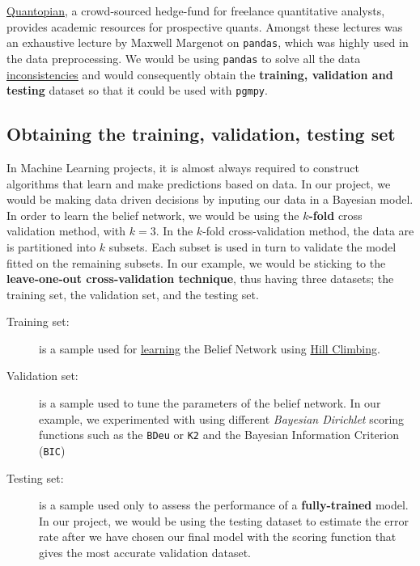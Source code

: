 \href{https://www.quantopian.com/}{Quantopian}, a crowd-sourced hedge-fund for freelance quantitative analysts, provides academic resources for prospective quants. Amongst these lectures was an exhaustive lecture by Maxwell Margenot \cite{maxwell} on \texttt{pandas}, which was highly used in the data preprocessing. We would be using \texttt{pandas} to solve all the data \hyperref[incons]{inconsistencies} and would consequently obtain the \textbf{training, validation and testing} dataset so that it could be used with \texttt{pgmpy}.\\

\subsection{Obtaining the training, validation, testing set}
\label{trainvaldtest}

In Machine Learning projects, it is  almost always required to construct algorithms that learn and make predictions based on data. In our project, we would be making data driven decisions by inputing our data in a Bayesian model. \\

In order to learn the belief network, we would be using the \textbf{$k$-fold} cross validation method, with $k=3$. In the $k$-fold cross-validation method, the data are is partitioned into $k$ subsets. Each subset is used in turn to validate the model fitted on the remaining subsets.  In our example, we would be sticking to the \textbf{leave-one-out cross-validation technique}, thus having three datasets; the training set, the validation set, and the testing set. \\


\begin{description}
	\item[Training set:] is a sample used for \hyperref[learn]{learning} the Belief Network using \hyperref[learn]{Hill Climbing}.
	\item[Validation set:]is a sample used to tune the parameters of the belief network. In our example, we experimented with using different \textit{Bayesian Dirichlet} scoring functions such as the \texttt{BDeu} or \texttt{K2} and the Bayesian Information Criterion (\texttt{BIC}) 
	\item[Testing set:]is a sample used only to assess the performance of a \textbf{fully-trained} model. In our project, we would be using the testing dataset to estimate the error rate after we have chosen our final model with the scoring function that gives the most accurate validation dataset. 
\end{description}

